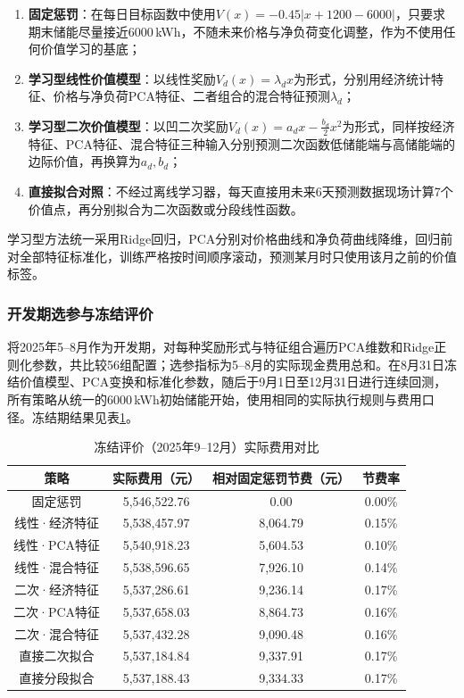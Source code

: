 \begin{enumerate}
  \item \textbf{固定惩罚}：在每日目标函数中使用$V(x)=-0.45\lvert x+1200-6000\rvert$，只要求期末储能尽量接近6000\,kWh，不随未来价格与净负荷变化调整，作为不使用任何价值学习的基底；
  \item \textbf{学习型线性价值模型}：以线性奖励$V_d(x)=\lambda_dx$为形式，分别用经济统计特征、价格与净负荷PCA特征、二者组合的混合特征预测$\lambda_d$；
  \item \textbf{学习型二次价值模型}：以凹二次奖励$V_d(x)=a_dx-\frac{b_d}{2}x^2$为形式，同样按经济特征、PCA特征、混合特征三种输入分别预测二次函数低储能端与高储能端的边际价值，再换算为$a_d,b_d$；
  \item \textbf{直接拟合对照}：不经过离线学习器，每天直接用未来6天预测数据现场计算7个价值点，再分别拟合为二次函数或分段线性函数。
\end{enumerate}

学习型方法统一采用Ridge回归，PCA分别对价格曲线和净负荷曲线降维，回归前对全部特征标准化，训练严格按时间顺序滚动，预测某月时只使用该月之前的价值标签。

\subsubsection{开发期选参与冻结评价}
将2025年5--8月作为开发期，对每种奖励形式与特征组合遍历PCA维数和Ridge正则化参数，共比较56组配置；选参指标为5--8月的实际现金费用总和。在8月31日冻结价值模型、PCA变换和标准化参数，随后于9月1日至12月31日进行连续回测，所有策略从统一的6000\,kWh初始储能开始，使用相同的实际执行规则与费用口径。冻结期结果见表\ref{tab:q4-frozen}。

\begin{table}[H]
  \centering
  \caption{冻结评价（2025年9--12月）实际费用对比}
  \label{tab:q4-frozen}
  \small
  \renewcommand{\arraystretch}{1.3}
  \begin{tabular}{|c|c|c|c|}
    \hline
    策略 & 实际费用（元） & 相对固定惩罚节费（元） & 节费率 \\
    \hline
    固定惩罚 & 5{,}546{,}522.76 & 0.00 & 0.00\% \\
    \hline
    线性·经济特征 & 5{,}538{,}457.97 & 8{,}064.79 & 0.15\% \\
    \hline
    线性·PCA特征 & 5{,}540{,}918.23 & 5{,}604.53 & 0.10\% \\
    \hline
    线性·混合特征 & 5{,}538{,}596.65 & 7{,}926.10 & 0.14\% \\
    \hline
    二次·经济特征 & 5{,}537{,}286.61 & 9{,}236.14 & 0.17\% \\
    \hline
    二次·PCA特征 & 5{,}537{,}658.03 & 8{,}864.73 & 0.16\% \\
    \hline
    二次·混合特征 & 5{,}537{,}432.28 & 9{,}090.48 & 0.16\% \\
    \hline
    直接二次拟合 & 5{,}537{,}184.84 & 9{,}337.91 & 0.17\% \\
    \hline
    直接分段拟合 & 5{,}537{,}188.43 & 9{,}334.33 & 0.17\% \\
    \hline
  \end{tabular}
\end{table}


